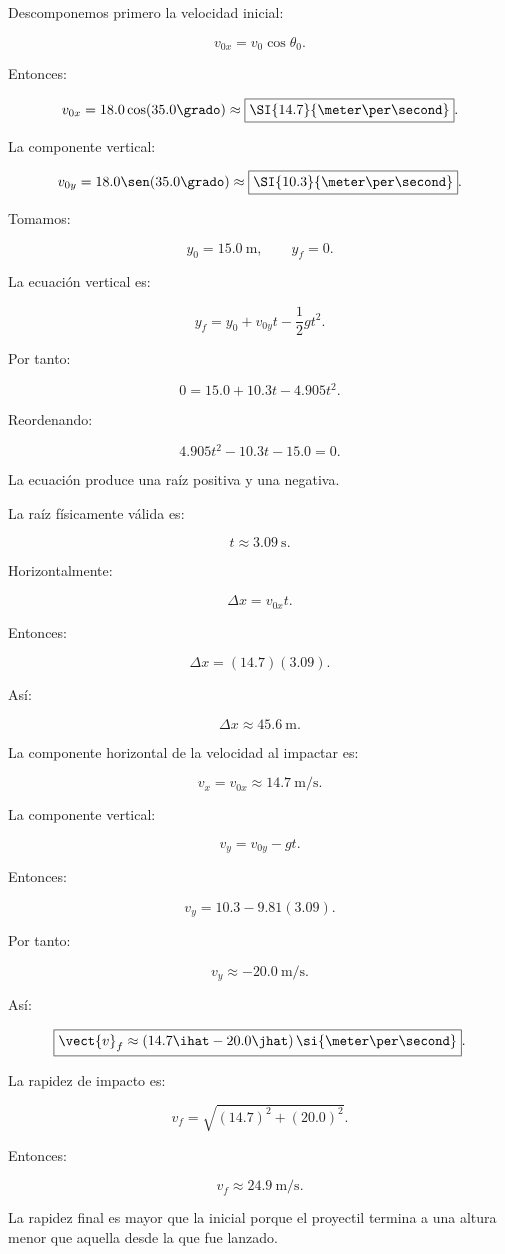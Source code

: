 \begin{explicacion}
Descomponemos primero la velocidad inicial:

\[
v_{0x}
=
v_0\cos\theta_0.
\]

Entonces:

\[
v_{0x}
=
18.0\cos(35.0\grado)
\approx
\boxed{\SI{14.7}{\meter\per\second}}.
\]

La componente vertical:

\[
v_{0y}
=
18.0\sen(35.0\grado)
\approx
\boxed{\SI{10.3}{\meter\per\second}}.
\]

Tomamos:

\[
y_0=\SI{15.0}{\meter},
\qquad
y_f=0.
\]

La ecuación vertical es:

\[
y_f
=
y_0+v_{0y}t-\frac{1}{2}gt^2.
\]

Por tanto:

\[
0
=
15.0+10.3t-4.905t^2.
\]

Reordenando:

\[
4.905t^2-10.3t-15.0=0.
\]

La ecuación produce una raíz positiva y una negativa.

La raíz físicamente válida es:

\[
\boxed{
t\approx\SI{3.09}{\second}
}.
\]

Horizontalmente:

\[
\Delta x=v_{0x}t.
\]

Entonces:

\[
\Delta x
=
(14.7)(3.09).
\]

Así:

\[
\boxed{
\Delta x\approx\SI{45.6}{\meter}
}.
\]

La componente horizontal de la velocidad al impactar es:

\[
v_x=v_{0x}
\approx
\SI{14.7}{\meter\per\second}.
\]

La componente vertical:

\[
v_y
=
v_{0y}-gt.
\]

Entonces:

\[
v_y
=
10.3-9.81(3.09).
\]

Por tanto:

\[
\boxed{
v_y\approx-\SI{20.0}{\meter\per\second}
}.
\]

Así:

\[
\boxed{
\vect{v}_f
\approx
(14.7\ihat-20.0\jhat)
\,\si{\meter\per\second}
}.
\]

La rapidez de impacto es:

\[
v_f
=
\sqrt{
(14.7)^2+(20.0)^2
}.
\]

Entonces:

\[
\boxed{
v_f\approx\SI{24.9}{\meter\per\second}
}.
\]

La rapidez final es mayor que la inicial porque el proyectil termina a una altura
menor que aquella desde la que fue lanzado.
\end{explicacion}



